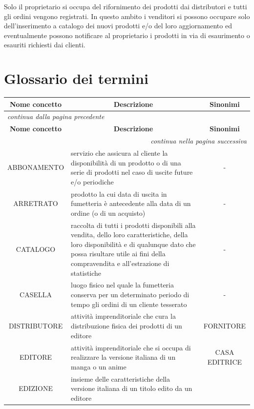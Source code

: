 \documentclass[a4paper]{scrartcl}
\begin{document}
Solo il proprietario si occupa del rifornimento dei prodotti dai distributori e tutti gli ordini vengono registrati. In questo ambito i venditori si possono occupare solo dell'inserimento a catalogo dei nuovi prodotti e/o del loro aggiornamento ed eventualmente possono notificare al proprietario i prodotti in via di esaurimento o esauriti richiesti dai clienti. 


\section*{Glossario dei termini}
\begin{longtable}{c p{2.8in} c}
	\toprule
	\multicolumn{1}{c}{\textbf{Nome concetto}} &
	\multicolumn{1}{c}{\textbf{Descrizione}} &
	\multicolumn{1}{c}{\textbf{Sinonimi}} \\
	\midrule
	\endfirsthead
	\multicolumn{3}{l}{\textit{\footnotesize continua dalla pagina precedente}} \\
	\toprule
	\multicolumn{1}{c}{\textbf{Nome concetto}} &
	\multicolumn{1}{c}{\textbf{Descrizione}} &
	\multicolumn{1}{c}{\textbf{Sinonimi}} \\
	\midrule
	\endhead
	\midrule
	\multicolumn{3}{r}{\textit{\footnotesize continua nella pagina successiva}} \\
	\endfoot
	\bottomrule
	\endlastfoot
	ABBONAMENTO &
	servizio che assicura al cliente la disponibilità di un prodotto o di una serie di prodotti nel caso di uscite future e/o periodiche &
	- \\
	ARRETRATO &
	prodotto la cui data di uscita in fumetteria è antecedente alla data di un ordine (o di un acquisto) &
	- \\
	CATALOGO &
	raccolta di tutti i prodotti disponibili alla vendita, dello loro caratteristiche, della loro disponibilità e di qualunque dato che possa risultare utile ai fini della 			compravendita e all'estrazione di statistiche &
	- \\
	CASELLA &
	luogo fisico nel quale la fumetteria conserva per un determinato periodo di tempo gli ordini di un cliente tesserato &
	- \\
	DISTRIBUTORE & 
	attività imprenditoriale che cura la distribuzione fisica dei prodotti di un editore &
	FORNITORE \\
	EDITORE &
	attività imprenditoriale che si occupa di realizzare la versione italiana di un manga o un anime &
	CASA EDITRICE \\
	EDIZIONE &
	insieme delle caratteristiche della versione italiana di un titolo edito da un editore &

\end{longtable}
\end{document}
